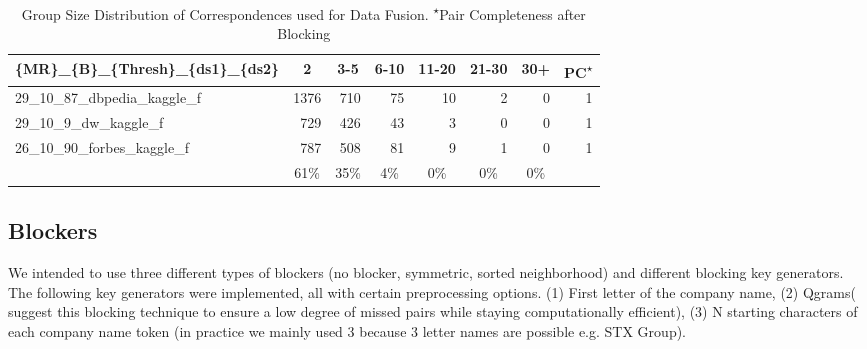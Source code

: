 \documentclass[11pt,titlepage,oneside,openany]{article}
\begin{document}
\begin{table}[]
	\centering
	\small
	\begin{tabular}{lrrrrrrr}
		\textbf{\{MR\}\_\{B\}\_\{Thresh\}\_\{ds1\}\_\{ds2\}} & \multicolumn{1}{c}{\textbf{2}} & \multicolumn{1}{c}{\textbf{3-5}} & \multicolumn{1}{c}{\textbf{6-10}} & \multicolumn{1}{c}{\textbf{11-20}} & \multicolumn{1}{c}{\textbf{21-30}} & \multicolumn{1}{c}{\textbf{30+}} & \multicolumn{1}{c}{\textbf{PC\textsuperscript{$\star$}}} \\\hline
		29\_10\_87\_dbpedia\_kaggle\_f              & 1376                           & 710                              & 75                                & 10                                 & 2                                  & 0                                & 1                               \\
		29\_10\_9\_dw\_kaggle\_f                    & 729                            & 426                              & 43                                & 3                                  & 0                                  & 0                                & 1                               \\
		26\_10\_90\_forbes\_kaggle\_f               & 787                            & 508                              & 81                                & 9                                  & 1                                  & 0                                & 1                               \\\hline
		\multicolumn{1}{c}{}                        & \multicolumn{1}{c}{61\%}       & \multicolumn{1}{c}{35\%}         & \multicolumn{1}{c}{4\%}           & \multicolumn{1}{c}{0\%}            & \multicolumn{1}{c}{0\%}            & \multicolumn{1}{c}{0\%}          & \multicolumn{1}{c}{}           
	\end{tabular}
	\caption[Group Size Distribution of Correspondences used for Data Fusion]{Group Size Distribution of Correspondences used for Data Fusion. \small\textsuperscript{$\star$}Pair Completeness after Blocking}
	\label{tab:group-size-dist}
\end{table}


\subsection{Blockers}
\label{sec:blockers}
We intended to use three different types of blockers (no blocker, symmetric, sorted neighborhood) and different blocking key generators. The following key generators were implemented, all with certain preprocessing options. (1) First letter of the company name, (2) Qgrams(\cite{gravano_approximate_nodate} suggest this blocking technique to ensure a low degree of missed pairs while staying computationally efficient), (3) N starting characters of each company name token (in practice we mainly used 3 because 3 letter names are possible e.g. STX Group).
\end{document}
